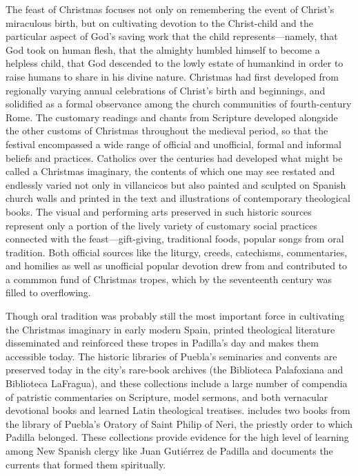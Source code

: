The feast of Christmas focuses not only on remembering the event of Christ's
miraculous birth, but on cultivating devotion to the Christ-child and the
particular aspect of God's saving work that the child represents---namely, that
God took on human flesh, that the almighty humbled himself to become a helpless
child, that God descended to the lowly estate of humankind in order to raise
humans to share in his divine nature.
Christmas had first developed from regionally varying annual celebrations of
Christ's birth and beginnings, and solidified as a formal observance among the
church communities of fourth-century Rome.%
    \Autocites
    [85--140]{Talley:LiturgicalYear}
    [86--89]{Bradshaw:EarlyWorship}
    {Roll:OriginsChristmas}
The customary readings and chants from Scripture developed alongside the other
customs of Christmas throughout the medieval period, so that the festival
encompassed a wide range of official and unofficial, formal and informal beliefs
and practices.
Catholics over the centuries had developed what might be called a Christmas
imaginary, the contents of which one may see restated and endlessly varied not
only in villancicos but also painted and sculpted on Spanish church walls and
printed in the text and illustrations of contemporary theological books.
The visual and performing arts preserved in such historic sources represent only
a portion of the lively variety of customary social practices connected with the
feast---gift-giving, traditional foods, popular songs from oral tradition.
Both official sources like the liturgy, creeds, catechisms, commentaries, and
homilies as well as unofficial popular devotion drew from and contributed to a
commmon fund of Christmas tropes, which by the seventeenth century was filled to
overflowing.

Though oral tradition was probably still the most important force in cultivating
the Christmas imaginary in early modern Spain, printed theological literature
disseminated and reinforced these tropes in Padilla's day and makes them
accessible today.
The historic libraries of Puebla's seminaries and convents are preserved today
in the city's rare-book archives (the Biblioteca Palafoxiana and Biblioteca
LaFragua), and these collections include a large number of compendia of
patristic commentaries on Scripture, model sermons, and both vernacular
devotional books and learned Latin theological treatises.%
    \Autocites
    [On patristic exegesis and its influence, see][]
    {Kannengiesser:PatristicExegesis}
    {McKim:BiblicalInterpreters}
    {Thompson:ReadingwDead}
 includes two books from the library of Puebla's
Oratory of Saint Philip of Neri, the priestly order to which Padilla belonged.%
    \Autocite{Mauleon:PadillaCivil}
These collections provide evidence for the high level of learning among New
Spanish clergy like Juan Gutiérrez de Padilla and documents the currents that
formed them spiritually.

